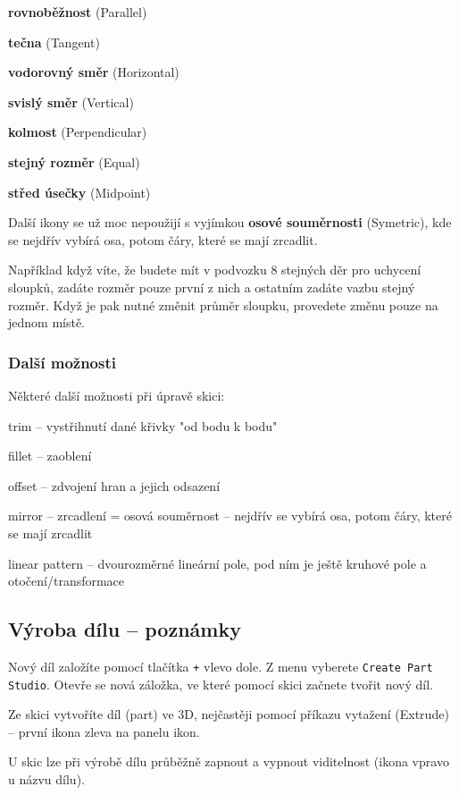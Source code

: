 \textbf{rovnoběžnost} (Parallel)

\textbf{tečna} (Tangent)

\textbf{vodorovný směr} (Horizontal)
 
\textbf{svislý směr} (Vertical)

\textbf{kolmost} (Perpendicular) 

\textbf{stejný rozměr} (Equal)

\textbf{střed úsečky} (Midpoint)

Další ikony se už moc nepoužijí s vyjímkou \textbf{osové souměrnosti} (Symetric), kde se nejdřív vybírá osa, potom čáry, které se mají zrcadlit.

Například když víte, že budete mít v podvozku 8 stejných děr pro uchycení sloupků, zadáte rozměr pouze první z nich a ostatním zadáte vazbu stejný rozměr.
Když je pak nutné změnit průměr sloupku, provedete změnu pouze na jednom místě. 

\subsubsection{Další možnosti}

Některé další možnosti při úpravě skici: 

trim -- vystřihnutí dané křivky "od bodu k bodu"

fillet -- zaoblení 

offset -- zdvojení hran a jejich odsazení 

mirror -- zrcadlení = osová souměrnost -- nejdřív se vybírá osa, potom čáry, které se mají zrcadlit

linear pattern -- dvourozměrné lineární pole, 
pod ním je ještě kruhové pole a otočení/transformace 
 

\subsection{Výroba dílu  -- poznámky} \label{dil:vyroba} 

Nový díl založíte pomocí tlačítka \texttt{+} vlevo dole. 
Z menu vyberete {\tt Create Part Studio}. 
Otevře se nová záložka, ve které pomocí skici začnete tvořit nový díl.  

Ze skici vytvoříte díl (part) ve 3D, nejčastěji pomocí příkazu vytažení (Extrude) -- první ikona zleva na panelu ikon. 

U skic lze při výrobě dílu průběžně zapnout a vypnout viditelnost (ikona  vpravo u názvu dílu).

